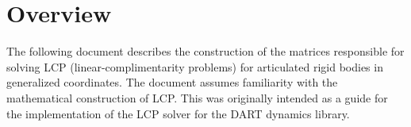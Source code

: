 \section{Overview}
The following document describes the construction of the matrices responsible for solving LCP (linear-complimentarity problems) for articulated rigid bodies in generalized coordinates. The document assumes familiarity with the mathematical construction of LCP. This was originally intended as a guide for the implementation of the LCP solver for the DART dynamics library.
